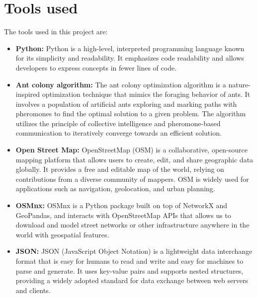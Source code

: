 \documentclass[titlepage]{article}
\begin{document}
\section{Tools used}
The tools used in this project are:
\begin{itemize}
    \item \textbf{Python:} Python is a high-level, interpreted programming language known for its simplicity and readability. It emphasizes code readability and allows developers to express concepts in fewer lines of code.
    \item \textbf{Ant colony algorithm:} The ant colony optimization algorithm is a nature-inspired optimization technique that mimics the foraging behavior of ants. It involves a population of artificial ants exploring and marking paths with pheromones to find the optimal solution to a given problem. The algorithm utilizes the principle of collective intelligence and pheromone-based communication to iteratively converge towards an efficient solution.
    \item \textbf{Open Street Map:} OpenStreetMap (OSM) is a collaborative, open-source mapping platform that allows users to create, edit, and share geographic data globally. It provides a free and editable map of the world, relying on contributions from a diverse community of mappers. OSM is widely used for applications such as navigation, geolocation, and urban planning.
    \item \textbf{OSMnx:} OSMnx is a Python package built on top of NetworkX and GeoPandas, and interacts with OpenStreetMap APIs that allows us to download and model street networks or other infrastructure anywhere in the world with geospatial features.
    \item \textbf{JSON:} JSON (JavaScript Object Notation) is a lightweight data interchange format that is easy for humans to read and write and easy for machines to parse and generate. It uses key-value pairs and supports nested structures, providing a widely adopted standard for data exchange between web servers and clients.
\end{itemize}
\end{document}
